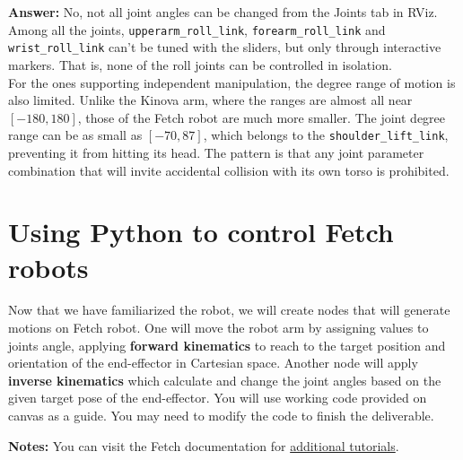 \documentclass[12pt]{article}
\begin{document}
\begin{enumerate}
    \textbf{Answer: }No, not all joint angles can be changed from the Joints tab in RViz.
    \\Among all the joints, \texttt{upperarm_roll_link}, \texttt{forearm_roll_link} and \texttt{wrist_roll_link} can't be tuned with the sliders, but only through interactive markers. That is, none of the roll joints can be controlled in isolation.
    \\For the ones supporting independent manipulation, the degree range of motion is also limited. Unlike the Kinova arm, where the ranges are almost all near $[-180, 180]$, those of the Fetch robot are much more smaller. The joint degree range can be as small as $[-70, 87]$, which belongs to the \texttt{shoulder_lift_link}, preventing it from hitting its head. The pattern is that any joint parameter combination that will invite accidental collision with its own torso is prohibited.
    
\end{enumerate}


\section{Using Python to control Fetch robots}

Now that we have familiarized the robot, we will create nodes that will generate motions on Fetch robot. One will move the robot arm by assigning values to joints angle, applying \textbf{forward kinematics} to reach to the target position and orientation of the end-effector in Cartesian space. Another node will apply 
\textbf{inverse kinematics} which calculate and change the joint angles based on the given target pose of the end-effector. You will use working code provided on canvas as a guide. You may need to modify the code to finish the deliverable.

\textbf{Notes:}
You can visit the Fetch documentation for \href{https://docs.fetchrobotics.com/manipulation.html#running-the-pick-and-place-demo}{additional tutorials}.\\
\end{document}
